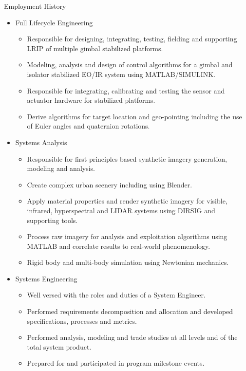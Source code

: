 \begin{rubric}{Employment History}
\begin{itemize}[nosep]
        \item Full Lifecycle Engineering
        \begin{itemize}[nosep]
            \item Responsible for designing, integrating, testing, fielding and supporting LRIP of multiple gimbal stabilized platforms.
            \item Modeling, analysis and design of control algorithms for a gimbal and isolator stabilized EO/IR system using MATLAB/SIMULINK.
            \item Responsible for integrating, calibrating and testing the sensor and actuator hardware for stabilized platforms.
            \item Derive algorithms for target location and geo-pointing including the use of Euler angles and quaternion rotations.
        \end{itemize}
        \item Systems Analysis
        \begin{itemize}[nosep]
            \item Responsible for first principles based synthetic imagery generation, modeling and analysis.
            \item Create complex urban scenery including using Blender.
            \item Apply material properties and render synthetic imagery for visible, infrared, hyperspectral and LIDAR systems using DIRSIG and supporting tools.
            \item Process raw imagery for analysis and exploitation algorithms using MATLAB and correlate results to real-world phenomenology.
            \item Rigid body and multi-body simulation using Newtonian mechanics.
        \end{itemize}
        \item Systems Engineering
        \begin{itemize}[nosep]
            \item Well versed with the roles and duties of a System Engineer.
            \item Performed requirements decomposition and allocation and developed specifications, processes and metrics.
            \item Performed analysis, modeling and trade studies at all levels and of the total system product.
            \item Prepared for and participated in program milestone events.
        \end{itemize}
    \end{itemize}
\end{rubric}
